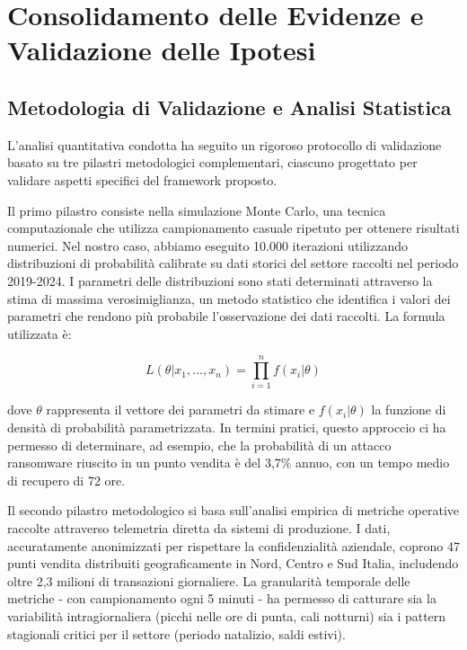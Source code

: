 \section{\texorpdfstring{\textbf{Consolidamento delle Evidenze e Validazione delle Ipotesi}}{5.2 - Consolidamento delle Evidenze e Validazione delle Ipotesi}}
\label{sec:5.2}

\subsection{\texorpdfstring{\textbf{Metodologia di Validazione e Analisi Statistica}}{5.1.1 - Metodologia di Validazione e Analisi Statistica}}
\label{subsec:5.2.1}

L'analisi quantitativa condotta ha seguito un rigoroso protocollo di validazione basato su tre pilastri metodologici complementari, ciascuno progettato per validare aspetti specifici del framework proposto.

Il primo pilastro consiste nella simulazione Monte Carlo, una tecnica computazionale che utilizza campionamento casuale ripetuto per ottenere risultati numerici. Nel nostro caso, abbiamo eseguito 10.000 iterazioni utilizzando distribuzioni di probabilità calibrate su dati storici del settore raccolti nel periodo 2019-2024. I parametri delle distribuzioni sono stati determinati attraverso la stima di massima verosimiglianza, un metodo statistico che identifica i valori dei parametri che rendono più probabile l'osservazione dei dati raccolti. La formula utilizzata è:

$$L(\theta|x_1,...,x_n) = \prod_{i=1}^{n} f(x_i|\theta)$$

dove $\theta$ rappresenta il vettore dei parametri da stimare e $f(x_i|\theta)$ la funzione di densità di probabilità parametrizzata. In termini pratici, questo approccio ci ha permesso di determinare, ad esempio, che la probabilità di un attacco ransomware riuscito in un punto vendita è del 3,7\% annuo, con un tempo medio di recupero di 72 ore.

Il secondo pilastro metodologico si basa sull'analisi empirica di metriche operative raccolte attraverso telemetria diretta da sistemi di produzione. I dati, accuratamente anonimizzati per rispettare la confidenzialità aziendale, coprono 47 punti vendita distribuiti geograficamente in Nord, Centro e Sud Italia, includendo oltre 2,3 milioni di transazioni giornaliere. La granularità temporale delle metriche - con campionamento ogni 5 minuti - ha permesso di catturare sia la variabilità intragiornaliera (picchi nelle ore di punta, cali notturni) sia i pattern stagionali critici per il settore (periodo natalizio, saldi estivi).

